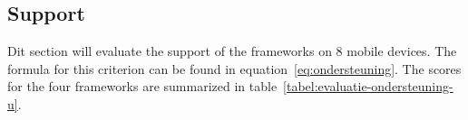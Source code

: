 \documentclass[a4paper]{artikel3}
\newcommand{\term}[1]{\emph{#1}}
\newcommand{\code}[1]{\texttt{#1}}
\newcommand{\setspace}[0]{\vspace{2mm}}
\renewcommand{\paragraph}[1]{\setspace \noindent {\bf #1}  }
\newcommand{\framework}[2]{ \emph{#1 (\textbf{#2}): }} %
\newcommand{\challenge}[1]{\paragraph{#1}}
\begin{document}
%
%
%
%
%
%
%
%
%
%

\subsection{Support} %
\label{sec:evaluation-support}

Dit section will evaluate the support of the frameworks on $8$ mobile devices.
The formula for this criterion can be found in equation~\ref{eq:ondersteuning}.
The scores for the four frameworks are summarized in table~\ref{tabel:evaluatie-ondersteuning-u}.
\end{document}
